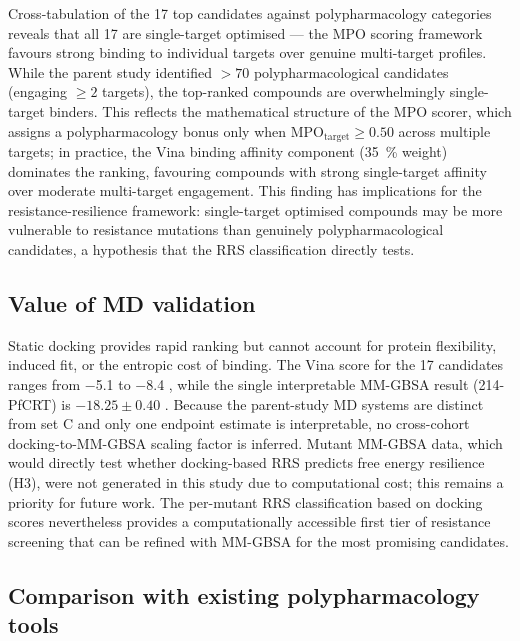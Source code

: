 \documentclass[11pt,a4paper]{article}
\begin{document}
Cross-tabulation of the \num{17} top candidates against polypharmacology categories reveals that all \num{17} are single-target optimised --- the MPO scoring framework favours strong binding to individual targets over genuine multi-target profiles. While the parent study identified $> \num{70}$ polypharmacological candidates (engaging $\geq 2$ targets), the top-ranked compounds are overwhelmingly single-target binders. This reflects the mathematical structure of the MPO scorer, which assigns a polypharmacology bonus only when MPO$_{\mathrm{target}} \geq \num{0.50}$ across multiple targets; in practice, the Vina binding affinity component (\qty{35}{\percent} weight) dominates the ranking, favouring compounds with strong single-target affinity over moderate multi-target engagement. This finding has implications for the resistance-resilience framework: single-target optimised compounds may be more vulnerable to resistance mutations than genuinely polypharmacological candidates, a hypothesis that the RRS classification directly tests.

\subsection{Value of MD validation}

Static docking provides rapid ranking but cannot account for protein flexibility, induced fit, or the entropic cost of binding. The Vina score for the 17 candidates ranges from $-$5.1 to $-$8.4 \si{\kcalmol}, while the single interpretable MM-GBSA result (214-PfCRT) is $-18.25 \pm 0.40$ \si{\kcalmol}. Because the parent-study MD systems are distinct from set C and only one endpoint estimate is interpretable, no cross-cohort docking-to-MM-GBSA scaling factor is inferred. Mutant MM-GBSA data, which would directly test whether docking-based RRS predicts free energy resilience (H3), were not generated in this study due to computational cost; this remains a priority for future work. The per-mutant RRS classification based on docking scores nevertheless provides a computationally accessible first tier of resistance screening that can be refined with MM-GBSA for the most promising candidates.

\subsection{Comparison with existing polypharmacology tools}
\end{document}

